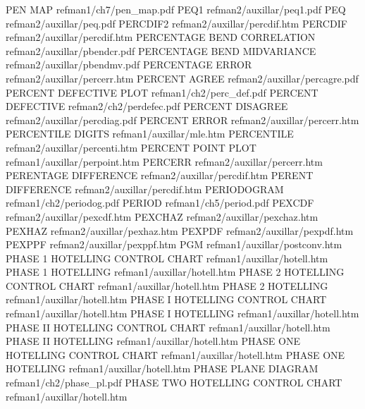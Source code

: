 PEN MAP                                 refman1/ch7/pen_map.pdf
PEQ1                                    refman2/auxillar/peq1.pdf
PEQ                                     refman2/auxillar/peq.pdf
PERCDIF2                                refman2/auxillar/percdif.htm
PERCDIF                                 refman2/auxillar/percdif.htm
PERCENTAGE BEND CORRELATION             refman2/auxillar/pbendcr.pdf
PERCENTAGE BEND MIDVARIANCE             refman2/auxillar/pbendmv.pdf
PERCENTAGE ERROR                        refman2/auxillar/percerr.htm
PERCENT AGREE                           refman2/auxillar/percagre.pdf
PERCENT DEFECTIVE PLOT                  refman1/ch2/perc_def.pdf
PERCENT DEFECTIVE                       refman2/ch2/perdefec.pdf
PERCENT DISAGREE                        refman2/auxillar/percdiag.pdf
PERCENT ERROR                           refman2/auxillar/percerr.htm
PERCENTILE DIGITS                       refman1/auxillar/mle.htm
PERCENTILE                              refman2/auxillar/percenti.htm
PERCENT POINT PLOT                      refman1/auxillar/perpoint.htm
PERCERR                                 refman2/auxillar/percerr.htm
PERENTAGE DIFFERENCE                    refman2/auxillar/percdif.htm
PERENT DIFFERENCE                       refman2/auxillar/percdif.htm
PERIODOGRAM                             refman1/ch2/periodog.pdf
PERIOD                                  refman1/ch5/period.pdf
PEXCDF                                  refman2/auxillar/pexcdf.htm
PEXCHAZ                                 refman2/auxillar/pexchaz.htm
PEXHAZ                                  refman2/auxillar/pexhaz.htm
PEXPDF                                  refman2/auxillar/pexpdf.htm
PEXPPF                                  refman2/auxillar/pexppf.htm
PGM                                     refman1/auxillar/postconv.htm
PHASE 1 HOTELLING CONTROL CHART         refman1/auxillar/hotell.htm
PHASE 1 HOTELLING                       refman1/auxillar/hotell.htm
PHASE 2 HOTELLING CONTROL CHART         refman1/auxillar/hotell.htm
PHASE 2 HOTELLING                       refman1/auxillar/hotell.htm
PHASE I HOTELLING CONTROL CHART         refman1/auxillar/hotell.htm
PHASE I HOTELLING                       refman1/auxillar/hotell.htm
PHASE II HOTELLING CONTROL CHART        refman1/auxillar/hotell.htm
PHASE II HOTELLING                      refman1/auxillar/hotell.htm
PHASE ONE HOTELLING CONTROL CHART       refman1/auxillar/hotell.htm
PHASE ONE HOTELLING                     refman1/auxillar/hotell.htm
PHASE PLANE DIAGRAM                     refman1/ch2/phase_pl.pdf
PHASE TWO HOTELLING CONTROL CHART       refman1/auxillar/hotell.htm

